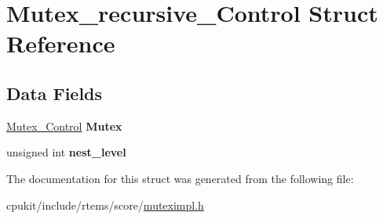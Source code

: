 \hypertarget{structMutex__recursive__Control}{}\section{Mutex\+\_\+recursive\+\_\+\+Control Struct Reference}
\label{structMutex__recursive__Control}
\subsection*{Data Fields}
\begin{DoxyCompactItemize}
\item 
\mbox{\label{structMutex__recursive__Control_a689ddf25535e0dee38e4026dc5d1236d}} 
\mbox{\hyperlink{structMutex__Control}{Mutex\+\_\+\+Control}} {\bfseries Mutex}
\item 
\mbox{\label{structMutex__recursive__Control_a00e74c2ea22ed895baf251a286e1779e}} 
unsigned int {\bfseries nest\+\_\+level}
\end{DoxyCompactItemize}


The documentation for this struct was generated from the following file\+:\begin{DoxyCompactItemize}
\item 
cpukit/include/rtems/score/\mbox{\hyperlink{score_2muteximpl_8h}{muteximpl.\+h}}\end{DoxyCompactItemize}

